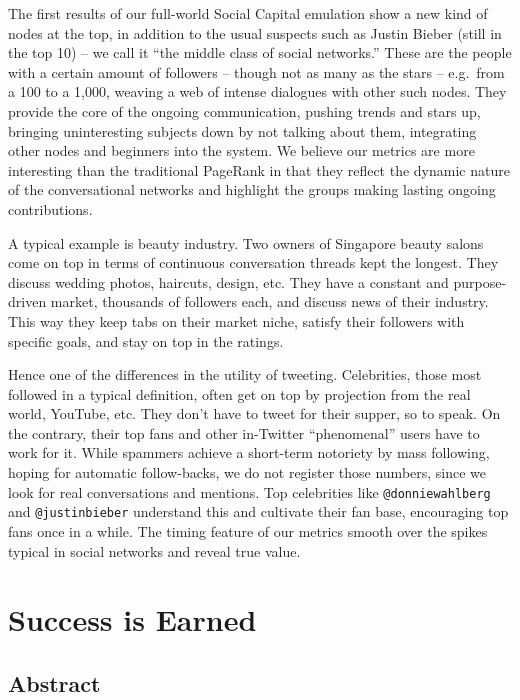 \documentclass[10pt,oneside]{memoir}
\begin{document}
The first results of our full-world Social Capital emulation show a new kind of nodes at the top, in addition to the usual suspects such as Justin Bieber (still in the top 10) -- we call it ``the middle class of social networks.'' These are the people with a certain amount of followers -- though not as many as the stars -- e.g.\ from a 100 to a 1,000, weaving a web of intense dialogues with other such nodes. They provide the core of the ongoing communication, pushing trends and stars up, bringing uninteresting subjects down by not talking about them, integrating other nodes and beginners into the system. We believe our metrics are more interesting than the traditional PageRank in that they reflect the dynamic nature of the conversational networks and highlight the groups making lasting ongoing contributions.


A typical example is beauty industry. Two owners of Singapore beauty salons come on top in terms of continuous conversation threads kept the longest. They discuss wedding photos, haircuts, design, etc. They have a constant and purpose-driven market, thousands of followers each, and discuss news of their industry. This way they keep tabs on their market niche, satisfy their followers with specific goals, and stay on top in the ratings.


Hence one of the differences in the utility of tweeting. Celebrities, those most followed in a typical definition, often get on top by projection from the real world, YouTube, etc. They don't have to tweet for their supper, so to speak. On the contrary, their top fans and other in-Twitter ``phenomenal'' users have to work for it. While spammers achieve a short-term notoriety by mass following, hoping for automatic follow-backs, we do not register those numbers, since we look for real conversations and mentions. Top celebrities like \texttt{@donniewahlberg} and \texttt{@justinbieber} understand this and cultivate their fan base, encouraging top fans once in a while. The timing feature of our metrics smooth over the spikes typical in social networks and reveal true value.


\pagebreak \chapter{Success is Earned}
\label{successisearned}

\section{Abstract}
\label{abstract}
\end{document}
